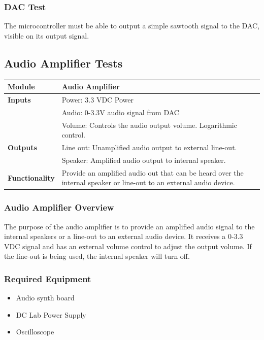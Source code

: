\documentclass{article}
\begin{document}
\subsubsection{DAC Test}
The microcontroller must be able to output a simple sawtooth signal to
the DAC, visible on its output signal.

\subsection{Audio Amplifier Tests}

\begin{tabular}{|p{1in}|p{5in}|}
\hline
\textbf{Module} & Audio Amplifier \\
\hline
\textbf{Inputs} & Power: 3.3 VDC Power\\
	      & Audio: 0-3.3V audio signal from DAC\\
	      & Volume: Controls the audio output volume. Logarithmic control.\\
\hline
\textbf{Outputs}& Line out: Unamplified audio output to external line-out.\\ 
	      & Speaker: Amplified audio output to internal speaker.\\
\hline
\textbf{Functionality}& Provide an amplified audio out that can be heard over the internal speaker or line-out to an external audio device.\\
\hline
\end{tabular}
\subsubsection{Audio Amplifier Overview}
The purpose of the audio amplifier is to provide an amplified audio signal to the internal speakers or a line-out to an external audio device.  It receives a 0-3.3 VDC signal and has an external volume control to adjust the output volume.  If the line-out is being used, the internal speaker will turn off.
\subsubsection{Required Equipment}
\begin{itemize}
\item Audio synth board
\item DC Lab Power Supply
\item Oscilloscope
\end{itemize}
\end{document}
